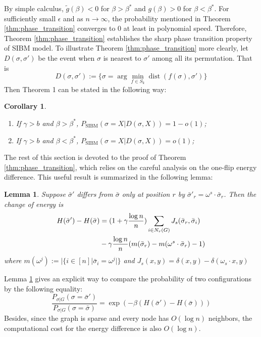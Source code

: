 \documentclass[journal]{IEEEtran}
\newtheorem{corollary}{Corollary}
\newtheorem{lemma}{Lemma}
\newcommand{\1}{\mathbbm{1}}
\DeclareMathOperator{\SIBM}{SIBM}
\DeclareMathOperator{\dist}{dist}
\begin{document}
By simple calculus, $\tilde{g}(\beta) < 0$ for $\beta> \beta^*$ and $g(\beta)>0$ for $\beta < \beta^*$.
For sufficiently small $\epsilon$ and as $n \to \infty$, the probability mentioned in Theorem \ref{thm:phase_transition} converges to $0$ at least
in polynomial speed.
Therefore, Theorem \ref{thm:phase_transition} establishes the sharp phase transition property of SIBM model.
To illustrate Theorem
\ref{thm:phase_transition} more clearly,
let $D(\sigma, \sigma')$ be the event when $\sigma$ is nearest to $\sigma'$ among all its permutation.
That is
\begin{equation}
D(\sigma, \sigma') := \{ \sigma = \arg\min_{f \in S_k} \dist(f(\sigma), \sigma')  \}
\end{equation}
Then Theorem 1 can be stated in the following way:
\begin{corollary}\label{cor:phase4}
\begin{enumerate}
	\item If $\gamma > b$ and $\beta > \beta^*$, $P_{\SIBM}(\sigma = X | D(\sigma, X))  = 1-o(1)$;
	\item If $\gamma > b$ and $\beta < \beta^*$, $P_{\SIBM}(\sigma = X | D(\sigma, X))  = o(1)$;
\end{enumerate}	
\end{corollary}

The rest of this section is devoted to the proof of Theorem \ref{thm:phase_transition}, which relies on the
careful analysis on the one-flip energy difference. This useful result is summarized in the following lemma:
\begin{lemma}\label{lem:lemmaDiff}
	Suppose $\bar{\sigma}'$ differs from $\bar{\sigma}$ only at position $r$ by $\bar{\sigma}'_r = \omega^s \cdot \bar{\sigma}_r$.
	Then the change of energy is
	\begin{align}
	H(\bar{\sigma}') - H(\bar{\sigma}) &= (1+\gamma \frac{\log n}{n})\sum_{i \in N_r(G)} J_s(\bar{\sigma}_r, \bar{\sigma}_i)
	\notag \\
	&- \gamma \frac{\log n}{n} (m(\bar{\sigma}_r)-m(\omega^s \cdot \bar{\sigma}_r)-1) \label{eq:DeltaH}
	\end{align}
	where $m(\omega^j) := |\{i \in [n] | \bar{\sigma}_i = \omega^j | \}$ and $J_s(x, y) = \delta(x, y) - \delta(\omega_s \cdot x, y)$
\end{lemma}
Lemma \ref{lem:lemmaDiff} gives an explicit way to compare the probability of two configurations by the following
equality:
\begin{equation}\label{eq:Pratio}
\frac{P_{\sigma |G } (\sigma = \bar{\sigma}')}{P_{\sigma |G } (\sigma = \bar{\sigma})}
= \exp(-\beta(H(\bar{\sigma}') - H(\bar{\sigma})))
\end{equation}
Besides, since the graph is sparse and every node has $O(\log n)$ neighbors, the computational cost for the energy difference
is also $O(\log n)$. 
\end{document}
